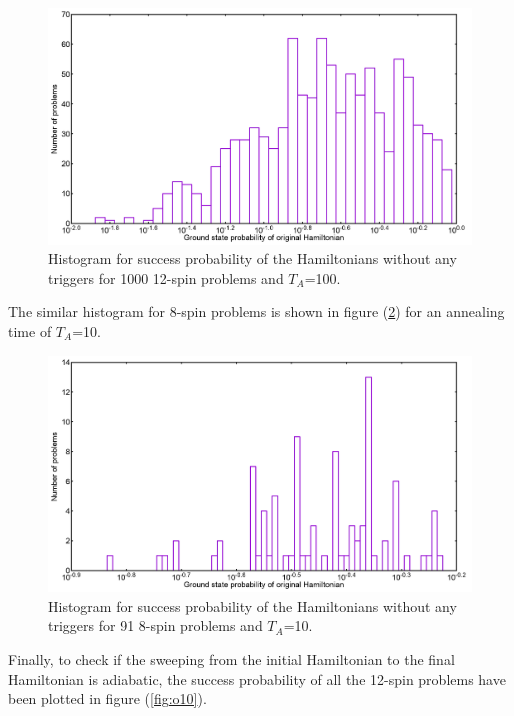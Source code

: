 \documentclass[12]{article}
\begin{document}
\begin{figure}[H]
\centering 
\includegraphics[scale=0.3]{O_s12_T100_g0.png}
\caption{Histogram for success probability of the Hamiltonians without any triggers for 1000 12-spin problems and $T_A$=100.}
\label{fig:o8}
\end{figure}
The similar histogram for 8-spin problems is shown in figure (\ref{fig:o9}) for an annealing time of $T_A$=10.
\begin{figure}[H]
\centering 
\includegraphics[scale=0.3]{O_s8_T10_g0.png}
\caption{Histogram for success probability of the Hamiltonians without any triggers for 91 8-spin problems and $T_A$=10.}
\label{fig:o9}
\end{figure}
Finally, to check if the sweeping from the initial Hamiltonian to the final Hamiltonian is adiabatic, the success probability of all the 12-spin problems have been plotted in figure (\ref{fig:o10}).
\end{document}
